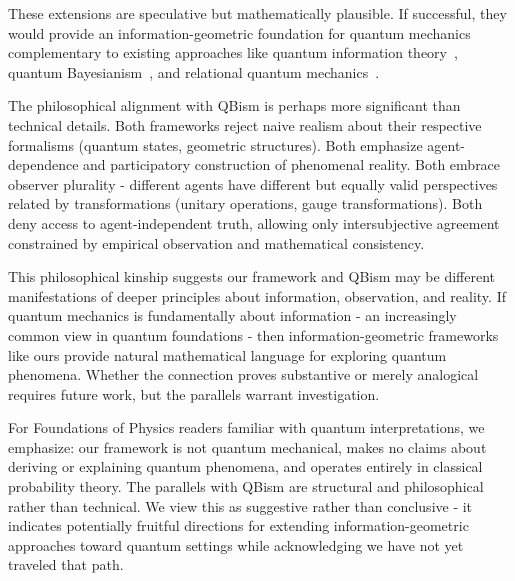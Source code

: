 \documentclass[11pt]{article}
\begin{document}
These extensions are speculative but mathematically plausible. If successful, they would provide an information-geometric foundation for quantum mechanics complementary to existing approaches like quantum information theory~\cite{Nielsen2000}, quantum Bayesianism~\cite{Fuchs2017}, and relational quantum mechanics~\cite{Rovelli1996}.

The philosophical alignment with QBism is perhaps more significant than technical details. Both frameworks reject naive realism about their respective formalisms (quantum states, geometric structures). Both emphasize agent-dependence and participatory construction of phenomenal reality. Both embrace observer plurality - different agents have different but equally valid perspectives related by transformations (unitary operations, gauge transformations). Both deny access to agent-independent truth, allowing only intersubjective agreement constrained by empirical observation and mathematical consistency.

This philosophical kinship suggests our framework and QBism may be different manifestations of deeper principles about information, observation, and reality. If quantum mechanics is fundamentally about information - an increasingly common view in quantum foundations - then information-geometric frameworks like ours provide natural mathematical language for exploring quantum phenomena. Whether the connection proves substantive or merely analogical requires future work, but the parallels warrant investigation.

For Foundations of Physics readers familiar with quantum interpretations, we emphasize: our framework is not quantum mechanical, makes no claims about deriving or explaining quantum phenomena, and operates entirely in classical probability theory. The parallels with QBism are structural and philosophical rather than technical. We view this as suggestive rather than conclusive - it indicates potentially fruitful directions for extending information-geometric approaches toward quantum settings while acknowledging we have not yet traveled that path.




\end{document}
